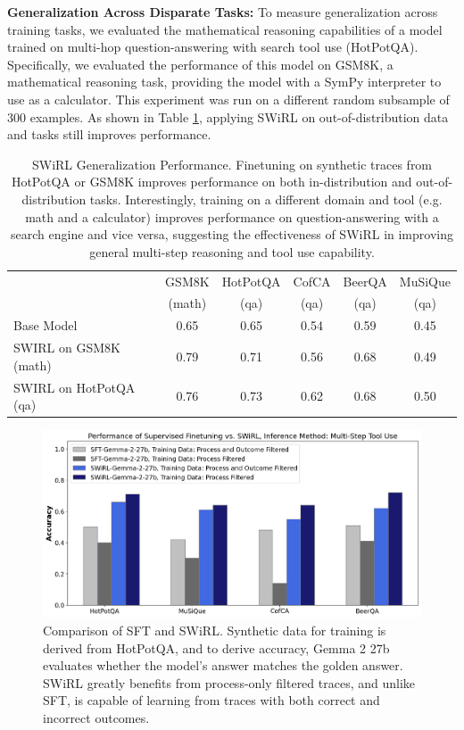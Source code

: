 \documentclass{article} %
\begin{document}
\noindent\textbf{Generalization Across Disparate Tasks:}
To measure generalization across training tasks, we evaluated the mathematical reasoning capabilities of a model trained on multi-hop question-answering with search tool use (HotPotQA). Specifically, we evaluated the performance of this model on GSM8K, a mathematical reasoning task, providing the model with a SymPy interpreter to use as a calculator. This experiment was run on a different random subsample of 300 examples. As shown in Table \ref{tab:generalization}, applying SWiRL  on out-of-distribution data and tasks still improves performance.

\begin{table}[t] %
  \centering
  \label{tab:transposed_metrics} %
  \begin{tabular}{lccccc}
    \toprule
    & \multicolumn{1}{c}{GSM8K} & \multicolumn{1}{c}{HotPotQA} & \multicolumn{1}{c}{CofCA} & \multicolumn{1}{c}{BeerQA} & \multicolumn{1}{c}{MuSiQue} \\
    & \multicolumn{1}{c}{(math)} & \multicolumn{1}{c}{(qa)} & \multicolumn{1}{c}{(qa)} & \multicolumn{1}{c}{(qa)} & \multicolumn{1}{c}{(qa)} \\
    \midrule
    Base Model      & 0.65 & 0.65 & 0.54 & 0.59 & 0.45 \\
    SWIRL on GSM8K (math) & 0.79 & 0.71 & 0.56 & 0.68 & 0.49 \\
    SWIRL on HotPotQA (qa) & 0.76 & 0.73 & 0.62 & 0.68 & 0.50 \\
    \bottomrule
  \end{tabular}
  \caption{SWiRL Generalization Performance. Finetuning on synthetic traces from HotPotQA or GSM8K improves performance on both in-distribution and out-of-distribution tasks. Interestingly, training on a different domain and tool (e.g. math and a calculator) improves performance on question-answering with a search engine and vice versa, suggesting the effectiveness of SWiRL in improving general multi-step reasoning and tool use capability.}
  \label{tab:generalization}
\end{table}
\begin{figure}[htbp!]
    \centering
    \includegraphics[width=.8\textwidth]{sft-rl.png}
    \caption{Comparison of SFT and SWiRL. Synthetic data for training is derived from HotPotQA, and to derive accuracy, Gemma 2 27b evaluates whether the model's answer matches the golden answer. SWiRL greatly benefits from process-only filtered traces, and unlike SFT, is capable of learning from traces with both correct and incorrect outcomes.}
    \label{fig:sft-vs-rl}
\end{figure}
\end{document}
